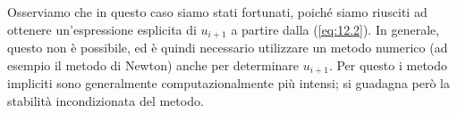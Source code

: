 \begin{remark}
    Osserviamo che in questo caso siamo stati fortunati, poiché siamo riusciti ad ottenere un'espressione esplicita di $u_{i+1}$ a partire dalla (\ref{eq:12.2}). In generale, questo non è possibile, ed è quindi necessario utilizzare un metodo numerico (ad esempio il metodo di Newton) anche per determinare $u_{i+1}$. Per questo i metodo impliciti sono generalmente computazionalmente più intensi; si guadagna però la stabilità incondizionata del metodo.  
\end{remark}
\newpage